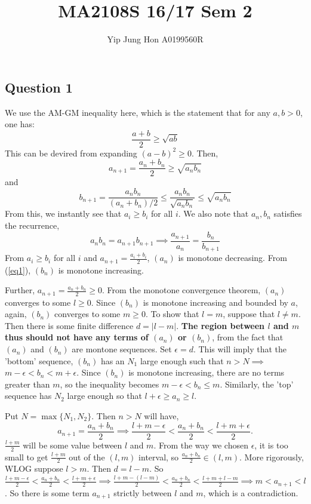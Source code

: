 \documentclass{article}
\title{MA2108S 16/17 Sem 2}
\author{Yip Jung Hon A0199560R}
\begin{document}
\maketitle

\subsection*{Question 1}
We use the AM-GM inequality here, which is the statement that for any $a,b >0$, one has:
\begin{equation*}
    \frac{a+b}{2} \geq \sqrt{ab} 
\end{equation*}
This can be devired from expanding $(a-b)^2 \geq 0$. Then,
\begin{equation*}
    a_{n+1}=\frac{a_n+b_n}{2} \geq \sqrt{a_nb_n} 
\end{equation*}
and 
\begin{equation*}
    b_{n+1}=\frac{a_nb_n}{(a_n+b_n)/2} \leq \frac{a_nb_n}{\sqrt{a_nb_n}} \leq \sqrt{a_nb_n}
\end{equation*}
From this, we instantly see that $a_i \geq b_i$ for all $i$.
We also note that $a_n, b_n$ satisfies the recurrence,
\begin{equation}
    a_nb_n = a_{n+1}b_{n+1} \implies \frac{a_{n+1}}{a_n} = \frac{b_n}{b_{n+1}} \label{eq1}
\end{equation}
From $a_i \geq b_i$ for all $i$ and $a_{n+1}=\frac{a_i+b_i}{2}$, $(a_n)$ is monotone decreasing. From (\ref{eq1}), $(b_n)$ is monotone increasing. 

Further, $a_{n+1}=\frac{a_n+b_n}{2}\geq 0$. From the monotone convergence theorem, $(a_n) $ converges to some $l \geq 0$. Since $(b_n)$ is monotone increasing and bounded by $a$, again, $(b_n)$ converges to some $m \geq 0$. To show that $l=m$, suppose that $l \neq m$. Then there is some finite difference $d=|l-m|$. \textbf{The region between $l$ and $m$ thus should not have any terms of $(a_n)$ or $(b_n)$}, from the fact that $(a_n)$ and $(b_n)$ are montone sequences. Set $\epsilon=d$. This will imply that the 'bottom' sequence, $(b_n)$ has an $N_1$ large enough such that $n > N \implies $ $m-\epsilon<b_n < m+ \epsilon$. Since $(b_n)$ is monotone increasing, there are no terms greater than $m$, so the inequality becomes $m-\epsilon < b_n \leq m $. Similarly, the 'top' sequence has $N_2$ large enough so that $l+\epsilon \geq a_n \geq l$. 

Put $N=\max\{N_1, N_2\}$. Then $n > N$ will have,
\begin{equation*}
    a_{n+1}=\frac{a_n+b_n}{2} \implies \frac{l+m-\epsilon}{2} < \frac{a_n+b_n}{2} < \frac{l+m+\epsilon}{2}.
\end{equation*}
$\frac{l+m}{2}$ will be some value between $l$ and $m$. From the way we chosen $\epsilon$, it is too small to get $\frac{l+m}{2}$ out of the $(l,m)$ interval, so $ \frac{a_n+b_n}{2} \in (l,m)$. More rigorously, WLOG suppose $l>m$. Then $d=l-m$. So $\frac{l+m-\epsilon}{2} < \frac{a_n+b_n}{2} < \frac{l+m+\epsilon}{2} \implies \frac{l+m-(l-m)}{2} < \frac{a_n+b_n}{2} < \frac{l+m+l-m}{2} \implies m < a_{n+1} < l$. So there is some term $a_{n+1}$ strictly between $l$ and $m$, which is a contradiction.
\end{document}
